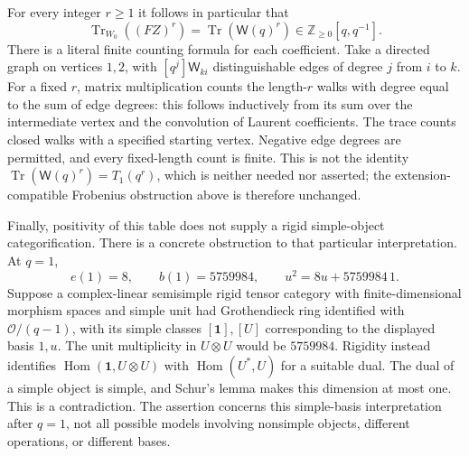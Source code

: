 For every integer $r\ge1$ it follows in particular that
\[
 \operatorname{Tr}_{W_0}((FZ)^r)
       =\operatorname{Tr}(\mathsf W(q)^r)
       \in\mathbb Z_{\ge0}[q,q^{-1}].
                                                               \tag{P-F52af}
\]
There is a literal finite counting formula for each coefficient.
Take a directed graph on vertices $1,2$, with
$[q^j]\mathsf W_{ki}$ distinguishable edges of degree $j$
from $i$ to $k$. For a fixed $r$, matrix multiplication
counts the length-$r$ walks with degree equal to the sum of
edge degrees: this follows inductively from its sum over the
intermediate vertex and the convolution of Laurent
coefficients. The trace counts closed walks with a specified
starting vertex. Negative edge degrees are permitted, and
every fixed-length count is finite. This is not the identity
$\operatorname{Tr}(\mathsf W(q)^r)=T_1(q^r)$, which is
neither needed nor asserted; the extension-compatible
Frobenius obstruction above is therefore unchanged.

Finally, positivity of this table does not supply a rigid
simple-object categorification. There is a concrete obstruction
to that particular interpretation. At $q=1$,
\[
             e(1)=8,\qquad b(1)=5759984,
             \qquad u^2=8u+5759984\,1.
                                                               \tag{P-F52ag}
\]
Suppose a complex-linear semisimple rigid tensor category
with finite-dimensional morphism spaces and simple unit
had Grothendieck ring identified with $\mathcal O/(q-1)$,
with its simple classes $[\mathbf1],[U]$ corresponding to
the displayed basis $1,u$.
The unit multiplicity in $U\otimes U$ would be $5759984$.
Rigidity instead identifies
$\operatorname{Hom}(\mathbf1,U\otimes U)$ with
$\operatorname{Hom}(U^*,U)$ for a suitable dual.
The dual of a simple object is simple, and Schur's lemma
makes this dimension at most one. This is a contradiction.
The assertion concerns this simple-basis interpretation
after $q=1$, not all possible models involving nonsimple
objects, different operations, or different bases.

